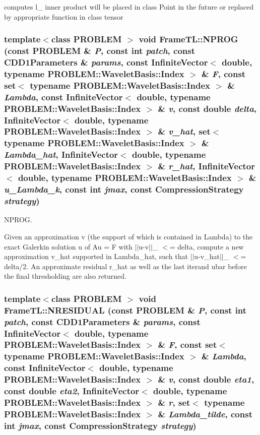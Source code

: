 computes l\_ inner product will be placed in class Point in the future or replaced by appropriate function in class tensor \hypertarget{namespaceFrameTL_d25b2eb9873b17224cdc0ddc9b0d04b1}{
\subsubsection[{NPROG}]{\setlength{\rightskip}{0pt plus 5cm}template$<$class PROBLEM $>$ void FrameTL::NPROG (const PROBLEM \& {\em P}, \/  const int {\em patch}, \/  const CDD1Parameters \& {\em params}, \/  const InfiniteVector$<$ double, typename PROBLEM::WaveletBasis::Index $>$ \& {\em F}, \/  const set$<$ typename PROBLEM::WaveletBasis::Index $>$ \& {\em Lambda}, \/  const InfiniteVector$<$ double, typename PROBLEM::WaveletBasis::Index $>$ \& {\em v}, \/  const double {\em delta}, \/  InfiniteVector$<$ double, typename PROBLEM::WaveletBasis::Index $>$ \& {\em v\_\-hat}, \/  set$<$ typename PROBLEM::WaveletBasis::Index $>$ \& {\em Lambda\_\-hat}, \/  InfiniteVector$<$ double, typename PROBLEM::WaveletBasis::Index $>$ \& {\em r\_\-hat}, \/  InfiniteVector$<$ double, typename PROBLEM::WaveletBasis::Index $>$ \& {\em u\_\-Lambda\_\-k}, \/  const int {\em jmax}, \/  const CompressionStrategy {\em strategy})}}
\label{namespaceFrameTL_d25b2eb9873b17224cdc0ddc9b0d04b1}


NPROG. 

Given an approximation v (the support of which is contained in Lambda) to the exact Galerkin solution u of Au = F with $|$$|$u-v$|$$|$\_ $<$= delta, compute a new approximation v\_\-hat supported in Lambda\_\-hat, such that $|$$|$u-v\_\-hat$|$$|$\_ $<$= delta/2. An approximate residual r\_\-hat as well as the last iterand ubar before the final thresholding are also returned. \hypertarget{namespaceFrameTL_e86daf5e125e66504844e002ba3dc4b5}{
\subsubsection[{NRESIDUAL}]{\setlength{\rightskip}{0pt plus 5cm}template$<$class PROBLEM $>$ void FrameTL::NRESIDUAL (const PROBLEM \& {\em P}, \/  const int {\em patch}, \/  const CDD1Parameters \& {\em params}, \/  const InfiniteVector$<$ double, typename PROBLEM::WaveletBasis::Index $>$ \& {\em F}, \/  const set$<$ typename PROBLEM::WaveletBasis::Index $>$ \& {\em Lambda}, \/  const InfiniteVector$<$ double, typename PROBLEM::WaveletBasis::Index $>$ \& {\em v}, \/  const double {\em eta1}, \/  const double {\em eta2}, \/  InfiniteVector$<$ double, typename PROBLEM::WaveletBasis::Index $>$ \& {\em r}, \/  set$<$ typename PROBLEM::WaveletBasis::Index $>$ \& {\em Lambda\_\-tilde}, \/  const int {\em jmax}, \/  const CompressionStrategy {\em strategy})}}
\label{namespaceFrameTL_e86daf5e125e66504844e002ba3dc4b5}


